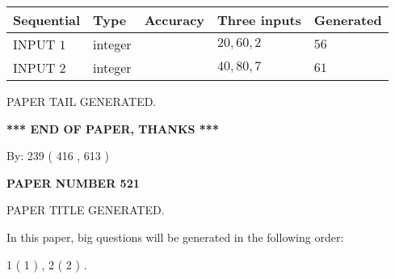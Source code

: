\documentclass{ctexart}
\begin{document}
   
  
  
\noindent\begin{tabular}{|l|l|l|l|l|}
\hline
 Sequential & Type & Accuracy & Three inputs & Generated \\ 
\hline
 
 
  INPUT $  1 $ & integer &  & $
 20
 , 
 60
 , 
 2
 $ & $ 56 $ 
 \\  \hline  
 
 
  INPUT $  2 $ & integer &  & $
 40
 , 
 80
 , 
 7
 $ & $ 61 $ 
 \\  \hline  
 \end{tabular}
   
   
   
   
   
   
 \vspace{0.2in}
 
   
   
\vspace{2.0in} PAPER TAIL GENERATED.
   
   
   
   
\vspace{1.0in} 
{\textbf{\large{ *** END OF PAPER, THANKS *** }}} 
   
   
\hspace{1.0in} By: 
 239 ( 416 ,  613 )
   
   
   
   
\newpage 
\setcounter{page}{ 
   521001 } 
   
   
   
   
 {\textbf{ \Large{ PAPER NUMBER  521  }}}
   
   
\vspace{0.2in}
   
   
   
   
   
   
   
   
 \vspace{0.2in}
 
 
 
 
   
   
 PAPER TITLE GENERATED.
   
   
   
\vspace{0.2in}
   
In this paper, big questions will be generated in the following order: 
   
   
   1 ( 1 )
 ,
   2 ( 2 )
 .
  
\end{document}
